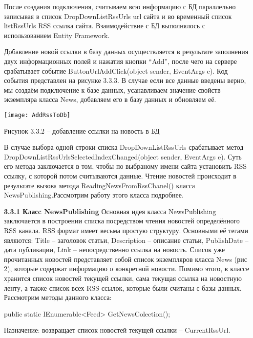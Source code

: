 \documentclass[14pt,a4paper]{extreport}
\begin{document}
\flushleft\parindent=1cm После создания подключения, считываем всю информацию с БД параллельно записывая в список DropDownListRssUrls url сайта и во временный список listRssUrls RSS ссылка сайта. Взаимодействие с БД выполнялось с использованием Entity Framework.\par
Добавление новой ссылки в базу данных осуществляется в результате заполнения двух информационных полей и нажатия кнопки “Add”, после чего на сервере срабатывает событие ButtonUrlAddClick(object sender, EventArgs e). Код события представлен на рисунке 3.3.3. В случае если все данные введены верно, мы создаём подключение к базе данных, усанавливаем значение свойств экземпляра класса News, добавляем его в базу данных и обновляем её.\par
	\center \texttt{[image: AddRssToDb]}\par   
           \center Рисунок 3.3.2 – добавление ссылки на новость в БД \par
           \flushleft\parindent=1cm В случае выбора одной строки списка DropDownListRssUrls срабатывает метод DropDownListRssUrlsSelectedIndexChanged(object sender, EventArgs e). Суть его метода заключается в том, чтобы по выбраному имени сайта установить RSS ссылку, с которой потом считываются данные. Чтение новостей происходит в результате вызова метода ReadingNewsFromRssChanel() класса NewsPublishing.Рассмотрим работу этого класса подробнее.\par
	\textbf{3.3.1 Класc NewsPublishing}
\flushleft\parindent=1cm Основная идея класса NewsPublishing заключается в построении списка посредством чтения новостей определённого RSS канала. RSS формат имеет весьма простую структуру. Основными её тегами являются: Title – заголовок статьи, Description – описание статьи, PublishDate – дата публикации, Link – непосредственно ссылка на новость. Список уже прочитанных новостей представляет собой список экземпляров класса News (рис 2), которые содержат информацию о конкретной новости. Помимо этого, в классе хранится список новостей текущей ссылки, сама текущая ссылка на новостную ленту, а также список всех RSS ссылок, которые были считаны с базы данных. Рассмотрим методы данного класса:\par
   \par
public static IEnumerable<Feed> GetNewsColection();\par
Назначение: возвращает список новостей текущей ссылки – CurrentRssUrl.\par
   \par
\end{document}
